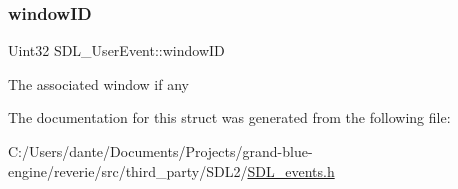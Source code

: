 \subsubsection{\texorpdfstring{windowID}{windowID}}
{\footnotesize\ttfamily Uint32 S\+D\+L\+\_\+\+User\+Event\+::window\+ID}

The associated window if any 

The documentation for this struct was generated from the following file\+:\begin{DoxyCompactItemize}
\item 
C\+:/\+Users/dante/\+Documents/\+Projects/grand-\/blue-\/engine/reverie/src/third\+\_\+party/\+S\+D\+L2/\mbox{\hyperlink{_s_d_l__events_8h}{S\+D\+L\+\_\+events.\+h}}\end{DoxyCompactItemize}
